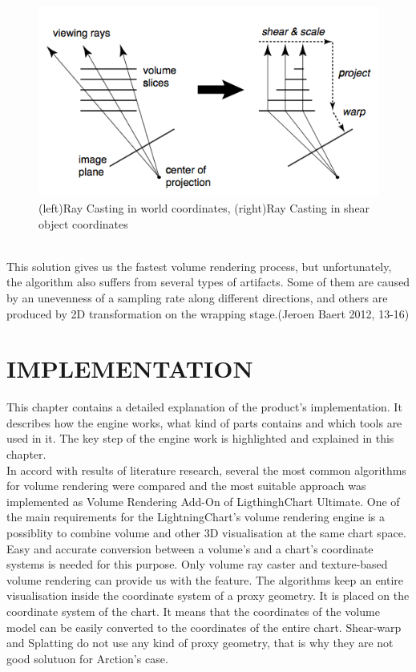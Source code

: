 \documentclass[twoside, english, 11pt]{report}
\begin{document}
\begin{figure}[!h]
\centerline{\includegraphics[scale=0.5]{img/shear-warp}}
\caption{(left)Ray Casting in world coordinates, (right)Ray Casting in shear object coordinates\label{fig:sw}}
\end{figure}
\\
This solution gives us the fastest volume rendering process, but unfortunately, the algorithm also suffers from several types of artifacts. Some of them are caused by an unevenness of a sampling rate along different directions, and others are produced by 2D transformation on the wrapping stage.(Jeroen Baert 2012, 13-16)\\

\chapter{IMPLEMENTATION}
This chapter contains a detailed explanation of the product's implementation. It describes how the engine works, what kind of parts contains and which tools are used in it. The key step of the engine work is highlighted and explained in this chapter.\\

In accord with results of literature research, several the most common algorithms for volume rendering were compared and the most suitable approach was implemented as Volume Rendering Add-On of LigthinghChart Ultimate. One of the main requirements for the LightningChart's volume rendering engine is a possiblity to combine volume and other 3D visualisation at the same chart space. Easy and accurate conversion between a volume's and a chart's coordinate systems is needed for this  purpose. Only volume ray caster and texture-based volume rendering can provide us with the feature. The algorithms keep an entire visualisation inside the coordinate system of a proxy geometry. It is placed on the coordinate system of the chart. It means that the coordinates of the volume model can be easily converted to the coordinates of the entire chart. Shear-warp and Splatting do not use any kind of proxy geometry, that is why they are not good solutuon for Arction's case.\\
\end{document}
